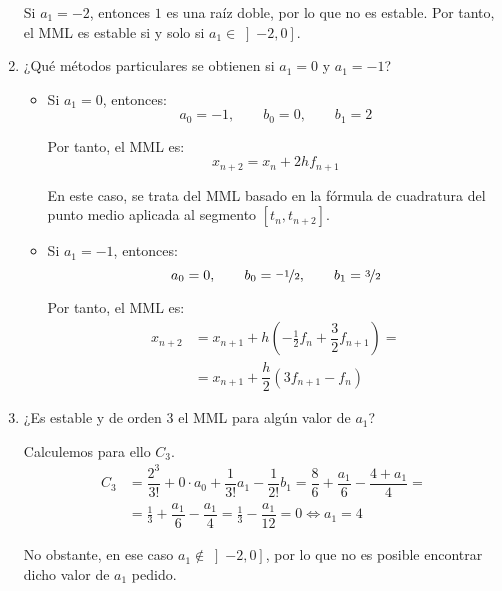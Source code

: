 \begin{ejercicio}
\begin{enumerate}
        Si $a_1=-2$, entonces $1$ es una raíz doble, por lo que no es estable. Por tanto, el MML es estable si y solo si $a_1\in \left]-2,0\right]$.
        \item ¿Qué métodos particulares se obtienen si $a_1 = 0$ y $a_1 = -1$?
        \begin{itemize}
            \item Si $a_1 = 0$, entonces:
            \begin{equation*}
                a_0 = -1,\qquad b_0 = 0,\qquad b_1 = 2
            \end{equation*}

            Por tanto, el MML es:
            \begin{equation*}
                x_{n+2} = x_n + 2h f_{n+1}
            \end{equation*}

            En este caso, se trata del MML basado en la fórmula de cuadratura del punto medio aplicada al segmento $[t_n, t_{n+2}]$.

            \item Si $a_1 = -1$, entonces:
            \begin{equation*}
                a_0 = 0,\qquad b_0 = \nicefrac{-1}{2},\qquad b_1 = \nicefrac{3}{2}
            \end{equation*}

            Por tanto, el MML es:
            \begin{align*}
                x_{n+2} &= x_{n+1} +h\left(-\frac{1}{2}f_n + \dfrac{3}{2}f_{n+1}\right)
                =\\&= x_{n+1} +\dfrac{h}{2}\left(3f_{n+1}-f_n\right)
            \end{align*}
        \end{itemize}
        \item ¿Es estable y de orden 3 el MML para algún valor de $a_1$?
        
        Calculemos para ello $C_3$.
        \begin{align*}
            C_3 &= \dfrac{2^3}{3!}+ 0\cdot a_0 + \dfrac{1}{3!}a_1 -\dfrac{1}{2!}b_1
            = \dfrac{8}{6} + \dfrac{a_1}{6} - \dfrac{4+a_1}{4}
            =\\&= \frac{1}{3}+ \dfrac{a_1}{6} -\dfrac{a_1}{4}
            = \frac{1}{3}- \dfrac{a_1}{12}
            =0 \iff a_1=4
        \end{align*}

        No obstante, en ese caso $a_1\notin \left]-2,0\right]$, por lo que no es posible encontrar dicho valor de $a_1$ pedido.
    \end{enumerate}
\end{ejercicio}

